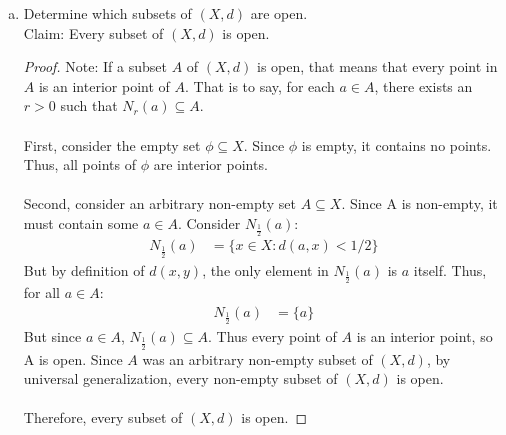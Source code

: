 \documentclass{amsart}
\begin{document}
\begin{enumerate}[1.]
\begin{enumerate}[(a)]
\begin{proof}
Finally, we aim to show that $d(x,y)$ obeys the triangle inequality: 
For $a,b,c\in X$, $d(a,b) \leq d(a,c) + d(c,b)$. \\

Suppose, for contradiction that $d(a,b) \nleq d(a,c) + d(c,b)$ for
some values $a,b,c\in X$.
The only way for this to happen, according to the definition of $d$,
is for $d(a,b) = 1$ and $d(a,c) = d(c,b) = 0$. But what would this imply?

\begin{align*}
    d(a,c) = 0 &\rightarrow a = c \\
    d(c,b) = 0 &\rightarrow b = c \\
    d(a,b) = 1 &\rightarrow a \neq b \\
\end{align*}
This is absurd! Therefore $d(x,y)$ obeys the triangle inequality.
Since $d(x,y)$ obeys separation, symmetry, and the triangle inequality,
$d(x,y)$ is a metric.
\end{proof}

        
    \item Determine which subsets of $(X,d)$ are open.\\
Claim: Every subset of $(X, d)$ is open.
\begin{proof}
Note: If a subset $A$ of $(X, d)$ is open, that means that every point in $A$
is an interior point of $A$. That is to say, for each $a\in A$, there exists
an $r > 0$ such that $N_r(a) \subseteq A$. \\\\
First, consider the empty set $\phi \subseteq X$. Since $\phi$ is empty,
it contains no points. Thus, all points of $\phi$ are interior points. \\\\
Second, consider an arbitrary non-empty set $A \subseteq X$. Since
A is non-empty, it must contain some $a \in A$.
Consider $N_\frac{1}{2}(a)$: 
\begin{align*}
    N_\frac{1}{2}(a) &= \{x\in X : d(a,x) < 1/2\}
\end{align*}
But by definition of $d(x,y)$, the only element in $N_\frac{1}{2}(a)$
is $a$ itself. Thus, for all $a\in A$:
\begin{align*}
    N_\frac{1}{2}(a) &= \{a\}
\end{align*}
But since $a\in A$, $N_\frac{1}{2}(a) \subseteq A$. Thus every point of $A$
is an interior point, so A is open. Since $A$ was an arbitrary non-empty subset of $(X,d)$, by universal generalization,
every non-empty subset of $(X,d)$ is open. \\\\
Therefore, every subset of $(X,d)$ is open.
\end{proof}
        

\end{enumerate}
\end{enumerate}
\end{document}
